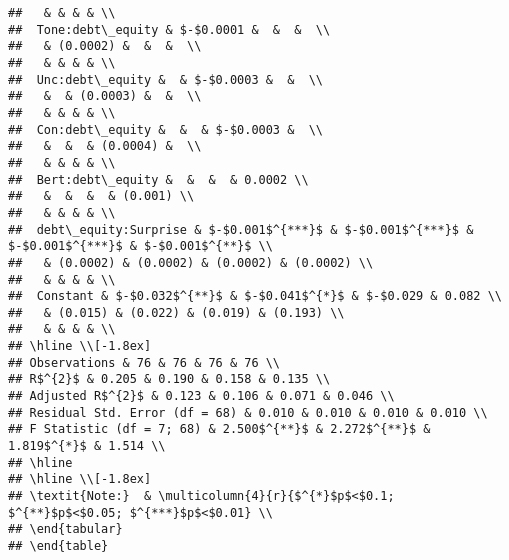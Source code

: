 \documentclass[
]{article}
\begin{document}
\begin{verbatim}
##   & & & & \\ 
##  Tone:debt\_equity & $-$0.0001 &  &  &  \\ 
##   & (0.0002) &  &  &  \\ 
##   & & & & \\ 
##  Unc:debt\_equity &  & $-$0.0003 &  &  \\ 
##   &  & (0.0003) &  &  \\ 
##   & & & & \\ 
##  Con:debt\_equity &  &  & $-$0.0003 &  \\ 
##   &  &  & (0.0004) &  \\ 
##   & & & & \\ 
##  Bert:debt\_equity &  &  &  & 0.0002 \\ 
##   &  &  &  & (0.001) \\ 
##   & & & & \\ 
##  debt\_equity:Surprise & $-$0.001$^{***}$ & $-$0.001$^{***}$ & $-$0.001$^{***}$ & $-$0.001$^{**}$ \\ 
##   & (0.0002) & (0.0002) & (0.0002) & (0.0002) \\ 
##   & & & & \\ 
##  Constant & $-$0.032$^{**}$ & $-$0.041$^{*}$ & $-$0.029 & 0.082 \\ 
##   & (0.015) & (0.022) & (0.019) & (0.193) \\ 
##   & & & & \\ 
## \hline \\[-1.8ex] 
## Observations & 76 & 76 & 76 & 76 \\ 
## R$^{2}$ & 0.205 & 0.190 & 0.158 & 0.135 \\ 
## Adjusted R$^{2}$ & 0.123 & 0.106 & 0.071 & 0.046 \\ 
## Residual Std. Error (df = 68) & 0.010 & 0.010 & 0.010 & 0.010 \\ 
## F Statistic (df = 7; 68) & 2.500$^{**}$ & 2.272$^{**}$ & 1.819$^{*}$ & 1.514 \\ 
## \hline 
## \hline \\[-1.8ex] 
## \textit{Note:}  & \multicolumn{4}{r}{$^{*}$p$<$0.1; $^{**}$p$<$0.05; $^{***}$p$<$0.01} \\ 
## \end{tabular} 
## \end{table}
\end{verbatim}
\end{document}
